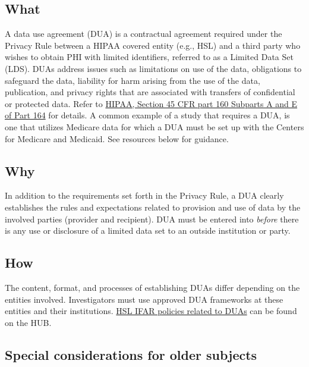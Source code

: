 \documentclass[]{book}
\begin{document}
\subsection{What}\label{what-7}

A data use agreement (DUA) is a contractual agreement required under the
Privacy Rule between a HIPAA covered entity (e.g., HSL) and a third
party who wishes to obtain PHI with limited identifiers, referred to as
a Limited Data Set (LDS). DUAs address issues such as limitations on use
of the data, obligations to safeguard the data, liability for harm
arising from the use of the data, publication, and privacy rights that
are associated with transfers of confidential or protected data. Refer
to
\href{http://www.hhs.gov/ocio/eplc/EPLC\%20Archive\%20Documents/55-Data\%20Use\%20Agreement\%20(DUA)/eplc_dua_practices_guide.pdf}{HIPAA,
Section 45 CFR part 160 Subparts A and E of Part 164} for details. A
common example of a study that requires a DUA, is one that utilizes
Medicare data for which a DUA must be set up with the Centers for
Medicare and Medicaid. See resources below for guidance.

\subsection{Why}\label{why-7}

In addition to the requirements set forth in the Privacy Rule, a DUA
clearly establishes the rules and expectations related to provision and
use of data by the involved parties (provider and recipient). DUA must
be entered into \emph{before} there is any use or disclosure of a
limited data set to an outside institution or party.

\subsection{How}\label{how-7}

The content, format, and processes of establishing DUAs differ depending
on the entities involved. Investigators must use approved DUA frameworks
at these entities and their institutions.
\href{http://thehslhub/~/media/HSLNet/P_P/IFAR/IFARPPCMS.ashx}{HSL IFAR
policies related to DUAs} can be found on the HUB.

\subsection{Special considerations for older
subjects}\label{special-considerations-for-older-subjects-2}
\end{document}
